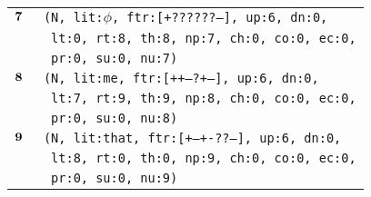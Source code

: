 \documentclass{article}
\begin{document}
\begin{minipage}{\textwidth}
{\begin{tabular}{|r|l|}
    ${\textbf{\textrm{7}}_{\phantom{z}}}$ & \texttt{\texttt{(N,~lit:$\phi$,~ftr:[+??????--],~up:6,~dn:0,}} \\
    & \texttt{\texttt{~lt:0,~rt:8,~th:8,~np:7,~ch:0,~co:0,~ec:0,}} \\
    & \texttt{\texttt{~pr:0,~su:0,~nu:7)}} \\
    ${\textbf{\textrm{8}}_{\phantom{z}}}$ & \texttt{\texttt{(N,~lit:me,~ftr:[++---?+--],~up:6,~dn:0,}} \\
    & \texttt{\texttt{~lt:7,~rt:9,~th:9,~np:8,~ch:0,~co:0,~ec:0,}} \\
    & \texttt{\texttt{~pr:0,~su:0,~nu:8)}} \\
    ${\textbf{\textrm{9}}_{\phantom{z}}}$ & \texttt{\texttt{(N,~lit:that,~ftr:[+--+-??--],~up:6,~dn:0,}} \\
    & \texttt{\texttt{~lt:8,~rt:0,~th:0,~np:9,~ch:0,~co:0,~ec:0,}} \\
    & \texttt{\texttt{~pr:0,~su:0,~nu:9)}} \\
    \hline
  \end{tabular}
  }
\end{minipage}
\bigbreak
\end{document}
